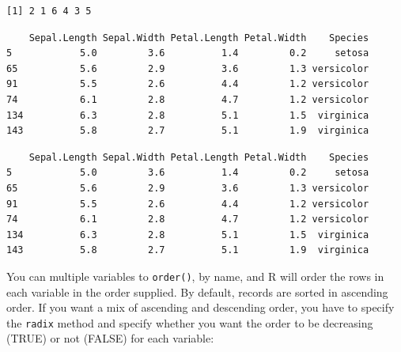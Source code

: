\documentclass[
  13,
  letterpaper,
]{report}
\newenvironment{Shaded}{\begin{snugshade}}{\end{snugshade}}
\newcommand{\DocumentationTok}[1]{\textcolor[rgb]{0.37,0.37,0.37}{\textit{#1}}}
\newcommand{\FunctionTok}[1]{\textcolor[rgb]{0.28,0.35,0.67}{#1}}
\newcommand{\NormalTok}[1]{\textcolor[rgb]{0.00,0.23,0.31}{#1}}
\newcommand{\SpecialCharTok}[1]{\textcolor[rgb]{0.37,0.37,0.37}{#1}}
\begin{document}
\begin{verbatim}
[1] 2 1 6 4 3 5
\end{verbatim}

\begin{Shaded}
\end{Shaded}

\begin{verbatim}
    Sepal.Length Sepal.Width Petal.Length Petal.Width    Species
5            5.0         3.6          1.4         0.2     setosa
65           5.6         2.9          3.6         1.3 versicolor
91           5.5         2.6          4.4         1.2 versicolor
74           6.1         2.8          4.7         1.2 versicolor
134          6.3         2.8          5.1         1.5  virginica
143          5.8         2.7          5.1         1.9  virginica
\end{verbatim}

\begin{Shaded}
\end{Shaded}

\begin{verbatim}
    Sepal.Length Sepal.Width Petal.Length Petal.Width    Species
5            5.0         3.6          1.4         0.2     setosa
65           5.6         2.9          3.6         1.3 versicolor
91           5.5         2.6          4.4         1.2 versicolor
74           6.1         2.8          4.7         1.2 versicolor
134          6.3         2.8          5.1         1.5  virginica
143          5.8         2.7          5.1         1.9  virginica
\end{verbatim}

You can multiple variables to \texttt{order()}, by name, and R will
order the rows in each variable in the order supplied. By default,
records are sorted in ascending order. If you want a mix of ascending
and descending order, you have to specify the \texttt{radix} method and
specify whether you want the order to be decreasing (TRUE) or not
(FALSE) for each variable:
\end{document}
